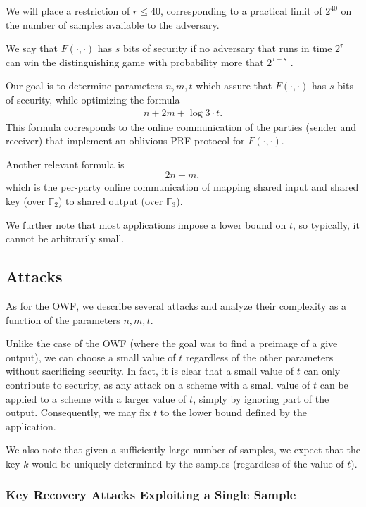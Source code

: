 \documentclass{article}
\begin{document}
We will place a restriction of $r \leq 40$,
corresponding to a practical limit of $2^{40}$ on the number of samples available to the adversary.

We say that $F(\cdot,\cdot)$ has $s$ bits of security if no adversary that runs in time $2^\tau$
can win the distinguishing game with probability more that $2^{\tau - s}$ .

Our goal is to determine parameters $n,m,t$ which assure that $F(\cdot,\cdot)$ has $s$ bits of security,
while optimizing the formula
\begin{align}
\label{eq:opt1}
n+ 2m + \log 3 \cdot t.
\end{align}
This formula corresponds to the online communication of the parties (sender and receiver) that implement an oblivious PRF protocol for $F(\cdot,\cdot)$.

Another relevant formula is
$$2n+m,$$
which is the per-party online communication of mapping shared input and shared key (over $\mathbb{F}_2$) to shared output (over $\mathbb{F}_3$).

We further note that most applications impose a lower bound on $t$, so typically, it cannot be arbitrarily small.

\subsection{Attacks}
\label{sec:basicprf}

As for the OWF, we describe several attacks and analyze their complexity as a function of the parameters $n,m,t$.

Unlike the case of the OWF (where the goal was to find a preimage of a give output),
we can choose a small value of $t$ regardless of the other parameters without sacrificing security. In fact, it is clear that a small value of $t$ can only contribute to security, as any attack on a scheme with a small value of $t$ can be applied to a scheme with a larger value of $t$, simply by ignoring part of the output. Consequently, we may fix $t$ to the lower bound defined by the application.

We also note that given a sufficiently large number of samples, we expect that the key $k$ would be uniquely determined by the samples (regardless of the value of $t$).

\subsubsection{Key Recovery Attacks Exploiting a Single Sample}
\end{document}
